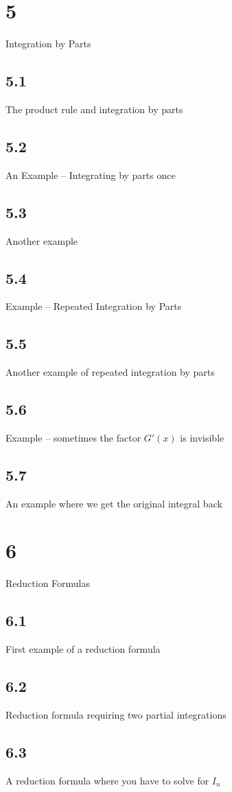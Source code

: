\section{5}{Integration by Parts}
\subsection{5.1}{The product rule and integration by parts}
\subsection{5.2}{An Example -- Integrating by parts once}
\subsection{5.3}{Another example}
\subsection{5.4}{Example -- Repeated Integration by Parts}
\subsection{5.5}{Another example of repeated integration by parts}
\subsection{5.6}{Example -- sometimes the factor $G'(x)$ is invisible}
\subsection{5.7}{An example where we get the original integral back}
\section{6}{Reduction Formulas}
\subsection{6.1}{First example of a reduction formula}
\subsection{6.2}{Reduction formula requiring two partial integrations}
\subsection{6.3}{A reduction formula where you have to solve for $I_n$}
